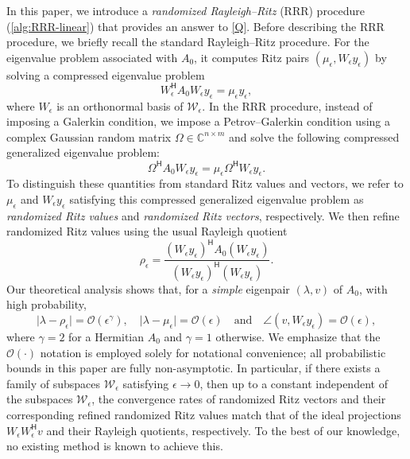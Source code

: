 \documentclass[a4paper,11pt]{article}
\newcommand{\Htran}{\mathsf{H}}
\newcommand{\order}{\mathcal{O}}
\newcommand{\C}{\mathbb{C}}
\providecommand{\abs}[1]{\lvert#1\rvert}
\begin{document}
In this paper, we introduce a \emph{randomized Rayleigh--Ritz} (RRR) procedure (\cref{alg:RRR-linear})  that provides an answer to \cref{Q}.
Before describing the RRR procedure, we briefly recall the standard Rayleigh--Ritz procedure. For the eigenvalue problem associated with $A_{0}$, it computes Ritz pairs $(\mu_{\epsilon}, W_{\epsilon} y_{\epsilon})$  by solving a compressed eigenvalue problem
\begin{equation*}
    W_{\epsilon}^{\Htran}A_{0}W_{\epsilon}y_{\epsilon}=\mu_{\epsilon} y_{\epsilon},
\end{equation*}
where $W_{\epsilon}$ is an orthonormal basis of $\mathcal{W}_{\epsilon}$.
In the RRR procedure, instead of imposing a Galerkin condition, we impose a Petrov--Galerkin condition using a complex Gaussian random matrix 
$\Omega\in\C^{n\times m}$ and solve the following compressed generalized eigenvalue problem:
\begin{equation*}
    \Omega^{\Htran}A_{0}W_{\epsilon}y_{\epsilon}=\mu_{\epsilon}\Omega^{\Htran}W_{\epsilon} y_{\epsilon}.
\end{equation*}
To distinguish these quantities from standard Ritz values and vectors, we refer to $\mu_{\epsilon}$ and $W_{\epsilon}y_{\epsilon}$ satisfying this compressed generalized eigenvalue problem as \emph{randomized Ritz values} and \emph{randomized Ritz vectors}, respectively. We then refine randomized Ritz values using the usual Rayleigh quotient
\begin{equation*}
    \rho_{\epsilon} = \frac{(W_{\epsilon}y_{\epsilon})^{\Htran}A_{0}(W_{\epsilon}y_{\epsilon})}{(W_{\epsilon}y_{\epsilon})^{\Htran}(W_{\epsilon}y_{\epsilon})}.
\end{equation*}
Our theoretical analysis shows that, for a \emph{simple} eigenpair $(\lambda,v)$ of $A_{0}$, with high probability, 
\begin{equation*}
    \abs{\lambda-\rho_{\epsilon}} = \order(\epsilon^{\gamma}),\quad 
    \abs{\lambda-\mu_{\epsilon}} = \order(\epsilon)
    \quad \text{and} \quad
    \angle(v, W_{\epsilon}y_{\epsilon}) = \order(\epsilon),
\end{equation*}
where $\gamma=2$ for a Hermitian $A_{0}$ and $\gamma=1$ otherwise.
We emphasize that the $\order(\cdot)$ notation is employed solely for notational convenience; all probabilistic bounds in this paper are fully non-asymptotic.
In particular, if there exists a family of subspaces $\mathcal{W}_{\epsilon}$ satisfying $\epsilon\to 0$, then up to a constant independent of the subspaces $\mathcal{W}_{\epsilon}$, the convergence rates of randomized Ritz vectors and their corresponding refined randomized Ritz values match that of the ideal projections $W_{\epsilon}W_{\epsilon}^{\Htran}v$ and their Rayleigh quotients, respectively.
To the best of our knowledge, no existing method is known to achieve this.
\end{document}
